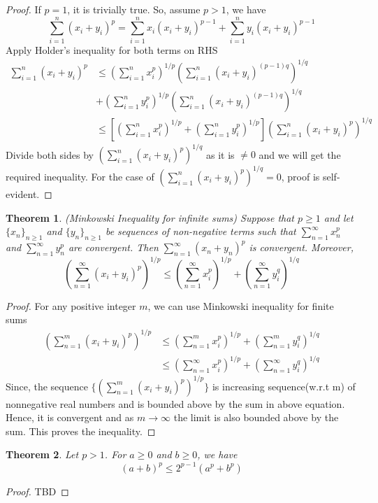 \documentclass[12pt]{report}
\newtheorem{thm}{Theorem}
\begin{document}
\begin{proof}
    If $p = 1$, it is trivially true. So, assume $p > 1$, we have
    $$ \sum\limits_{i=1}^n(x_i + y_i)^p = \sum\limits_{i=1}^{n} x_i(x_i + y_i)^{p-1} + \sum\limits_{i = 1}^n y_i(x_i + y_i)^{p-1}$$
    Apply Holder's inequality for both terms on RHS
    \begin{align*}
        \sum\limits_{i=1}^n(x_i + y_i)^p &\leq \left(\sum\limits_{i=1}^n x_i^p \right)^{1/p} \left(\sum\limits_{i=1}^n (x_i + y_i)^{(p-1)q}\right)^{1/q} \\
        &+ \left(\sum\limits_{i=1}^n y_i^p \right)^{1/p} \left(\sum\limits_{i=1}^n (x_i + y_i)^{(p-1)q}\right)^{1/q}\\
        &\leq \left[\left(\sum\limits_{i=1}^n x_i^p\right)^{1/p} + \left(\sum\limits_{i=1}^n y_i^p\right)^{1/p}\right] \left(\sum\limits_{i=1}^n(x_i + y_i)^p\right)^{1/q}
    \end{align*}
    Divide both sides by $\left(\sum\limits_{i=1}^n(x_i + y_i)^p\right)^{1/q}$ as it is $\neq 0$ and we will get the required inequality. For the case of $\left(\sum\limits_{i=1}^n(x_i + y_i)^p\right)^{1/q} = 0$, proof is self-evident. 
\end{proof}
\begin{thm}
    (Minkowski Inequality for infinite sums) Suppose that $p \geq 1$ and let $\{x_n\}_{n \geq 1}$ and $\{y_n\}_{n \geq 1}$ be sequences of non-negative terms such that $\sum\limits_{n=1}^{\infty} x_n^p$ and $\sum\limits_{n=1}^{\infty} y_n^p$ are convergent. Then $\sum\limits_{n=1}^{\infty} (x_n + y_n)^p$ is convergent. Moreover,
    $$ \left(\sum\limits_{n =1}^{\infty}(x_i + y_i)^p\right)^{1/p} \leq \left(\sum\limits_{n =1}^{\infty}x_i^p\right)^{1/p} + \left(\sum\limits_{n =1}^{\infty}y_i^q\right)^{1/q} $$
\end{thm}
\begin{proof}
    For any positive integer $m$, we can use Minkowski inequality for finite sums 
    \begin{align*}
        \left(\sum\limits_{n =1}^m(x_i + y_i)^p\right)^{1/p} &\leq \left(\sum\limits_{n =1}^mx_i^p\right)^{1/p} + \left(\sum\limits_{n =1}^my_i^q\right)^{1/q}\\
        &\leq \left(\sum\limits_{n =1}^{\infty}x_i^p\right)^{1/p} + \left(\sum\limits_{n =1}^{\infty}y_i^q\right)^{1/q}
    \end{align*}
    Since, the sequence $\{(\sum\limits_{n =1}^m(x_i + y_i)^p)^{1/p}\}$ is increasing sequence(w.r.t m) of nonnegative real numbers and is bounded above by the sum in above equation. Hence, it is convergent and as $m \to \infty$ the limit is also bounded above by the sum. This proves the inequality.
\end{proof}
\begin{thm} \label{22}
    Let $p > 1$. For $ a \geq 0$ and $ b \geq 0$, we have
    $$ (a + b)^p \leq 2^{p-1}(a^p + b^p)$$
\end{thm}
\begin{proof}
    TBD
\end{proof}
\end{document}

